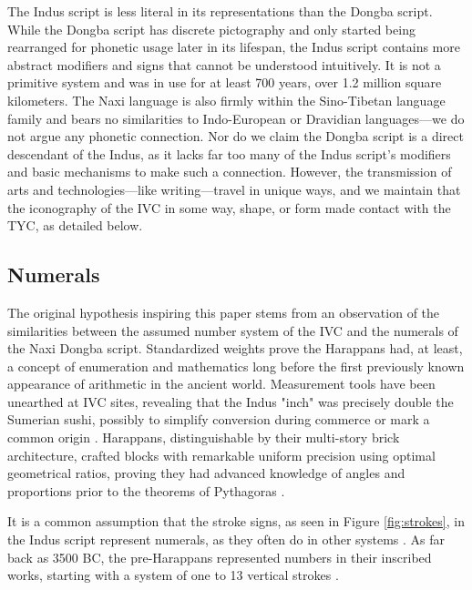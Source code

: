 \documentclass[11pt,a4paper,oneside]{report}
\begin{document}
The Indus script is less literal in its representations than the Dongba script. While the Dongba script has discrete pictography and only started being rearranged for phonetic usage later in its lifespan, the Indus script contains more abstract modifiers and signs that cannot be understood intuitively. It is not a primitive system and was in use for at least 700 years, over 1.2 million square kilometers. The Naxi language is also firmly within the Sino-Tibetan language family and bears no similarities to Indo-European or Dravidian languages—we do not argue any phonetic connection. Nor do we claim the Dongba script is a direct descendant of the Indus, as it lacks far too many of the Indus script's modifiers and basic mechanisms to make such a connection. However, the transmission of arts and technologies—like writing—travel in unique ways, and we maintain that the iconography of the IVC in some way, shape, or form made contact with the TYC, as detailed below.

\subsection{Numerals}
\noindent\hspace{1cm}
The original hypothesis inspiring this paper stems from an observation of the similarities between the assumed number system of the IVC and the numerals of the Naxi Dongba script. Standardized weights prove the Harappans had, at least, a concept of enumeration and mathematics long before the first previously known appearance of arithmetic in the ancient world. Measurement tools have been unearthed at IVC sites, revealing that the Indus "inch" was precisely double the Sumerian sushi, possibly to simplify conversion during commerce or mark a common origin \cite{singh_early_2019}. Harappans, distinguishable by their multi-story brick architecture, crafted blocks with remarkable uniform precision using optimal geometrical ratios, proving they had advanced knowledge of angles and proportions prior to the theorems of Pythagoras \cite{ghanta_overview_2020, khan_bricks_2013}. 

It is a common assumption that the stroke signs, as seen in Figure \ref{fig:strokes}, in the Indus script represent numerals, as they often do in other systems \cite{parpola_deciphering_1994, korvink_indus_2011, wells_epigraphic_2011}. As far back as 3500 BC, the pre-Harappans represented numbers in their inscribed works, starting with a system of one to 13 vertical strokes \cite{ghanta_overview_2020}.
\end{document}

